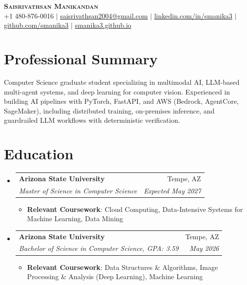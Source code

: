\documentclass[letterpaper,11pt]{article}
\makeatletter
\newcommand{\resumeItem}[1]{
  \item\small{
    {#1 \vspace{-2pt}}
  }
}
\newcommand{\resumeSubheading}[4]{
  \vspace{-1pt}\item
    \begin{tabular*}{0.97\textwidth}[t]{l@{\extracolsep{\fill}}r}
      \textbf{#1} & #2 \\
      \textit{\small#3} & \textit{\small #4} \\
    \end{tabular*}\vspace{-7pt}
}
\newcommand{\resumeSubHeadingListStart}{\begin{itemize}[leftmargin=0.15in, label={}]}
\newcommand{\resumeSubHeadingListEnd}{\end{itemize}}
\newcommand{\resumeItemListStart}{\begin{itemize}}
\newcommand{\resumeItemListEnd}{\end{itemize}\vspace{-5pt}}
\makeatother
\begin{document}
\begin{center}
    \textbf{\Huge \scshape Saisrivathsan Manikandan} \\ \vspace{1pt}
    \small +1 480-876-0016 $|$ 
    \href{mailto:saisrivathsan2004@gmail.com}{\underline{saisrivathsan2004@gmail.com}} $|$ 
    \href{https://linkedin.com/in/smanika3}{\underline{linkedin.com/in/smanika3}} $|$
    \href{https://github.com/smanika3}{\underline{github.com/smanika3}} $|$
    \href{https://smanika3.github.io/}{\underline{smanika3.github.io}}
\end{center}

\section{Professional Summary}
\small{Computer Science graduate student specializing in multimodal AI, LLM-based multi-agent systems, and deep learning for computer vision. Experienced in building AI pipelines with PyTorch, FastAPI, and AWS (Bedrock, AgentCore, SageMaker), including distributed training, on-premises inference, and guardrailed LLM workflows with deterministic verification.}

\section{Education}
  \resumeSubHeadingListStart
    \resumeSubheading
      {Arizona State University}{Tempe, AZ}
      {Master of Science in Computer Science}{Expected May 2027}
        \resumeItemListStart
        \resumeItem{\textbf{Relevant Coursework}: Cloud Computing, Data-Intensive Systems for Machine Learning, Data Mining}
      \resumeItemListEnd

      \resumeSubheading
      {Arizona State University}{Tempe, AZ}
      {Bachelor of Science in Computer Science, GPA: 3.59}{May 2026}
      \resumeItemListStart
        \resumeItem{\textbf{Relevant Coursework}: Data Structures \& Algorithms, Image Processing \& Analysis (Deep Learning), Machine Learning}
      \resumeItemListEnd
  \resumeSubHeadingListEnd

\end{document}
